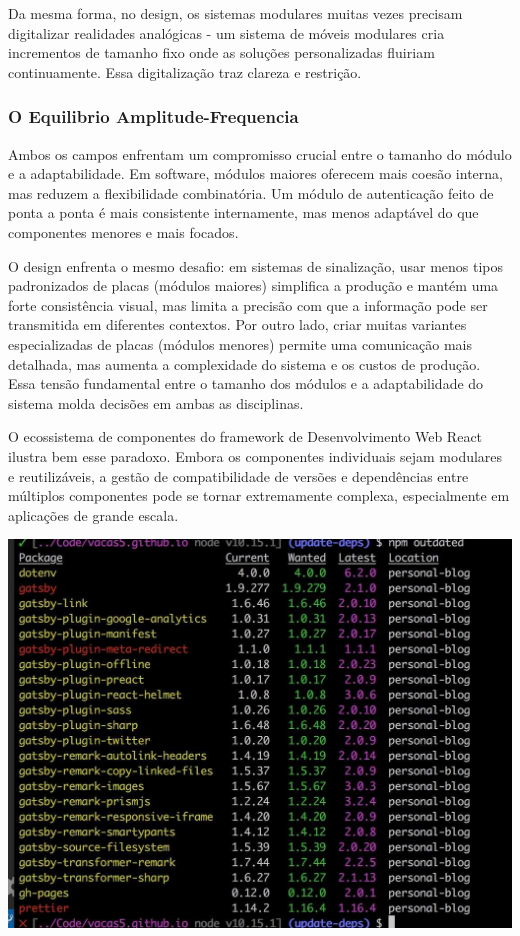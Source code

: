 \documentclass[12pt]{article}
\begin{document}
Da mesma forma, no design, os sistemas modulares muitas vezes precisam digitalizar realidades analógicas - um sistema de móveis modulares cria incrementos de tamanho fixo onde as soluções personalizadas fluiriam continuamente. Essa digitalização traz clareza e restrição.

\subsubsection{O Equilibrio Amplitude-Frequencia}
Ambos os campos enfrentam um compromisso crucial entre o tamanho do módulo e a adaptabilidade. Em software, módulos maiores oferecem mais coesão interna, mas reduzem a flexibilidade combinatória. Um módulo de autenticação feito de ponta a ponta é mais consistente internamente, mas menos adaptável do que componentes menores e mais focados. 

O design enfrenta o mesmo desafio: em sistemas de sinalização, usar menos tipos padronizados de placas (módulos maiores) simplifica a produção e mantém uma forte consistência visual, mas limita a precisão com que a informação pode ser transmitida em diferentes contextos. Por outro lado, criar muitas variantes especializadas de placas (módulos menores) permite uma comunicação mais detalhada, mas aumenta a complexidade do sistema e os custos de produção. Essa tensão fundamental entre o tamanho dos módulos e a adaptabilidade do sistema molda decisões em ambas as disciplinas.

\vspace{20px}
\noindent
\begin{minipage}{0.6\textwidth}\raggedright
O ecossistema de componentes do framework de Desenvolvimento Web React ilustra bem esse paradoxo. Embora os componentes individuais sejam modulares e reutilizáveis, a gestão de compatibilidade de versões e dependências entre múltiplos componentes pode se tornar extremamente complexa, especialmente em aplicações de grande escala.
\end{minipage}
\begin{minipage}{0.4\textwidth}
\includegraphics[width=1\textwidth]{react-deps-hell.jpg}
\end{minipage}
\end{document}
